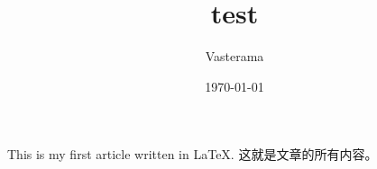\documentclass[UTF8]{ctexart}
\title{test}
\author{Vastera\textunderscore ma}
\date{\today}
\begin{document}
 
    \maketitle
    
    This is my first article written in \LaTeX.
    这就是文章的所有内容。
    
    
\end{document}
